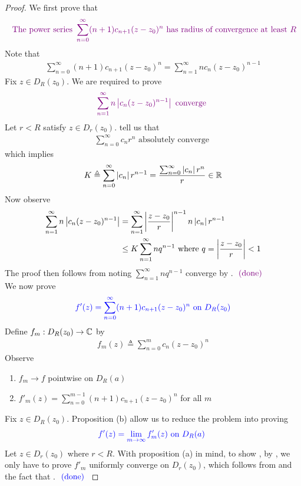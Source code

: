 \documentclass{report}
\begin{document}
\begin{proof}
We first prove that 
\begin{align*}
\textcolor{violet}{\text{ The power series }\sum_{n=0}^{\infty}(n+1)c_{n+1}(z-z_0)^n\text{ has radius of convergence at least }R}
\end{align*}
Note that 
\begin{align*}
  \sum_{n=0}^{\infty}(n+1)c_{n+1}(z-z_0)^n=\sum_{n=1}^{\infty}nc_n(z-z_0)^{n-1}
\end{align*}
Fix $z \in D_R(z_0)$. We are required to prove 
\begin{align*}
  \textcolor{violet}{\sum_{n=1}^{\infty} n \left|c_n(z-z_0)^{n-1}\right|\text{ converge }}
\end{align*}
Let $r<R$ satisfy $z\in D_r(z_0)$.  tell us that 
\begin{align*}
\sum_{n=0}^{\infty} c_nr^n\text{ absolutely converge }
\end{align*}
which implies 
\begin{align*}
K\triangleq \sum_{n=0}^{\infty}\left|c_n\right|r^{n-1}=\frac{\sum_{n=0}^{\infty}\left|c_n\right|r^n}{r}\in\mathbb{R}
\end{align*}
Now observe 
\begin{align*}
\sum_{n=1}^{\infty}n\left|c_n(z-z_0)^{n-1}\right|&=\sum_{n=1}^{\infty} \left|\frac{z-z_0}{r}\right|^{n-1}n\left|c_n\right|r^{n-1}\\
&\leq K\sum_{n=1}^{\infty} nq^{n-1}\text{ where }q= \left|\frac{z-z_0}{r}\right|<1
\end{align*}
The proof then follows from noting $\sum_{n=1}^{\infty} nq^{n-1}$ converge by . $\textcolor{violet}{\text{ (done) }}$\\

We now prove 
\begin{align*}
\textcolor{blue}{f'(z)=\sum_{n=0}^{\infty}(n+1)c_{n+1}(z-z_0)^n\text{ on }D_R(z_0)}
\end{align*}
Define $f_m:D_R(z_0)\rightarrow \mathbb{C}$ by
 \begin{align*}
f_m(z)\triangleq \sum_{n=0}^{m} c_n(z-z_0)^n
\end{align*}
Observe 
\begin{enumerate}[label=(\alph*)]
  \item $f_m\to f$ pointwise on $D_R(a)$ 
  \item $f'_m(z)=\sum_{n=0}^{m-1}(n+1)c_{n+1}(z-z_0)^n$ for all $m$
\end{enumerate}
Fix $z\in D_R(z_0)$. Proposition (b) allow us to reduce the problem into proving
\begin{align}
\label{an1}
  \textcolor{blue}{f'(z)=\lim_{m\to \infty}f'_m(z)\text{ on $D_R(a)$ }}
\end{align}
Let $z\in D_r(z_0)$ where $r<R$. With proposition (a) in mind, to show , by , we only have to prove $f'_m$ uniformly converge on $D_r(z_0)$, which follows from  and the fact that . $\textcolor{blue}{\text{ (done) }}$ 
\end{proof}
\end{document}
